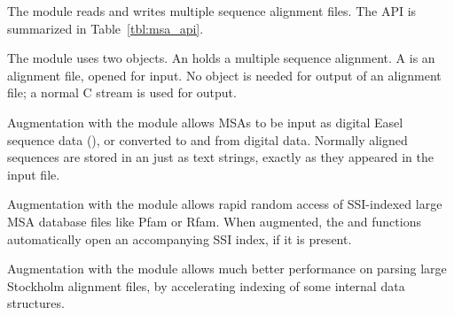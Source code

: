 The  module reads and writes multiple sequence alignment
files. The API is summarized in Table~\ref{tbl:msa_api}.

The module uses two objects. An  holds a multiple
sequence alignment. A  is an alignment file,
opened for input. No object is needed for output of an alignment file;
a normal C  stream is used for output.  

Augmentation with the  module allows MSAs to be input
as digital Easel sequence data (), or converted to and
from digital data. Normally aligned sequences are stored in an
 just as text strings, exactly as they appeared in the
input file.

Augmentation with the  module allows rapid random access
of SSI-indexed large MSA database files like Pfam or Rfam. When
augmented, the  and
 functions automatically open an
accompanying SSI index, if it is present.

Augmentation with the  module allows much better
performance on parsing large Stockholm alignment files, by
accelerating indexing of some internal data structures.


